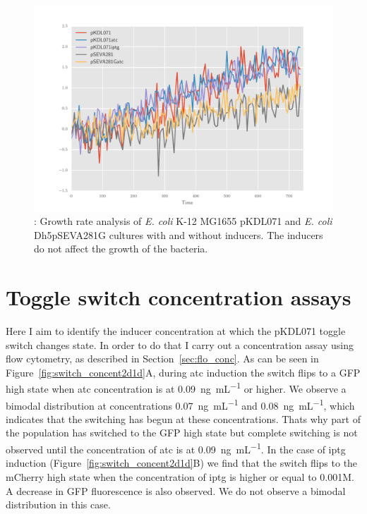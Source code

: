\begin{figure}[htbp]
	\begin{center}
		\includegraphics[scale=0.7]{chapterCharacterisation/images/growth_curves.pdf}
		\caption[LoF caption]{\label{fig:growth_curve}: Growth rate analysis of \textit{E. coli} K-12 MG1655 pKDL071 and \textit{E. coli} Dh5\textalpha pSEVA281G cultures with and without inducers. The inducers do not affect the growth of the bacteria. }
	\end{center}
\end{figure}

\clearpage

\section{Toggle switch concentration assays}

Here I aim to identify the inducer concentration at which the pKDL071 toggle switch changes state. In order to do that I carry out a concentration assay using flow cytometry, as described in Section~\ref{sec:flo_conc}. As can be seen in Figure~\ref{fig:switch_concent2d1d}A, during \acrshort{atc} induction the switch flips to a GFP high state when \acrshort{atc} concentration is at \SI{0.09}{\nano\gram\per\milli\liter} or higher. We observe a bimodal distribution at concentrations \SI{0.07}{\nano\gram\per\milli\liter} and \SI{0.08}{\nano\gram\per\milli\liter}, which indicates that the switching has begun at these concentrations. Thats why part of the population has switched to the GFP high state but complete switching is not observed until the concentration of \acrshort{atc} is at \SI{0.09}{\nano\gram\per\milli\liter}. In the case of \acrshort{iptg} induction (Figure~\ref{fig:switch_concent2d1d}B) we find that the switch flips to the mCherry high state when the concentration of \acrshort{iptg} is higher or equal to 0.001M. A decrease in GFP fluorescence is also observed. We do not observe a bimodal distribution in this case. 

